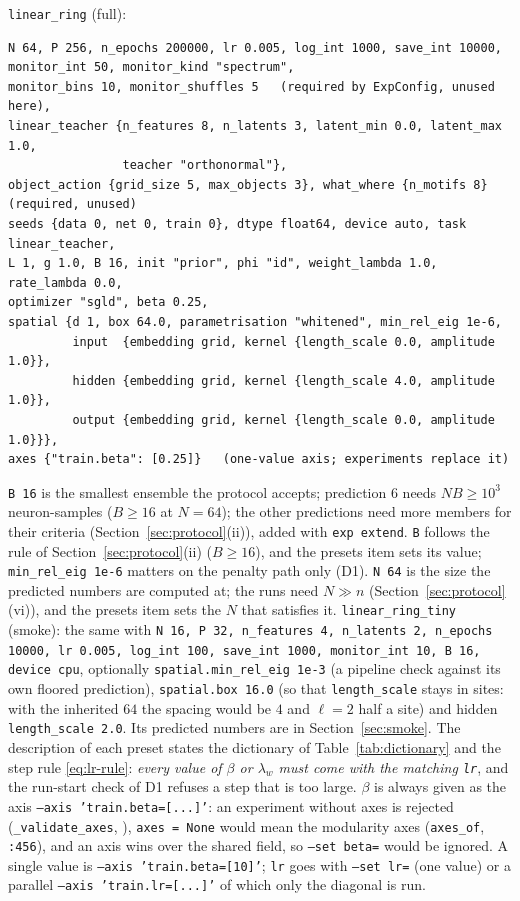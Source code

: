 \documentclass[11pt,a4paper]{article}
\newcommand{\code}[1]{\texttt{#1}}
\begin{document}
\code{linear\_ring} (full):
\begin{verbatim}
N 64, P 256, n_epochs 200000, lr 0.005, log_int 1000, save_int 10000,
monitor_int 50, monitor_kind "spectrum",
monitor_bins 10, monitor_shuffles 5   (required by ExpConfig, unused here),
linear_teacher {n_features 8, n_latents 3, latent_min 0.0, latent_max 1.0,
                teacher "orthonormal"},
object_action {grid_size 5, max_objects 3}, what_where {n_motifs 8}   (required, unused)
seeds {data 0, net 0, train 0}, dtype float64, device auto, task linear_teacher,
L 1, g 1.0, B 16, init "prior", phi "id", weight_lambda 1.0, rate_lambda 0.0,
optimizer "sgld", beta 0.25,
spatial {d 1, box 64.0, parametrisation "whitened", min_rel_eig 1e-6,
         input  {embedding grid, kernel {length_scale 0.0, amplitude 1.0}},
         hidden {embedding grid, kernel {length_scale 4.0, amplitude 1.0}},
         output {embedding grid, kernel {length_scale 0.0, amplitude 1.0}}},
axes {"train.beta": [0.25]}   (one-value axis; experiments replace it)
\end{verbatim}
\code{B 16} is the smallest ensemble the protocol accepts; prediction 6 needs $NB\ge10^3$ neuron-samples ($B\ge16$ at $N = 64$); the other predictions need more members for their criteria (Section~\ref{sec:protocol}(ii)), added with \code{exp extend}. \code{B} follows the rule of Section~\ref{sec:protocol}(ii) ($B\ge16$), and the presets item sets its value; \code{min\_rel\_eig 1e-6} matters on the penalty path only (D1). \code{N 64} is the size the predicted numbers are computed at; the runs need $N\gg n$ (Section~\ref{sec:protocol}(vi)), and the presets item sets the $N$ that satisfies it. \code{linear\_ring\_tiny} (smoke): the same with \code{N 16, P 32, n\_features 4, n\_latents 2, n\_epochs 10000, lr 0.005, log\_int 100, save\_int 1000, monitor\_int 10, B 16, device cpu}, optionally \code{spatial.min\_rel\_eig 1e-3} (a pipeline check against its own floored prediction), \code{spatial.box 16.0} (so that \code{length\_scale} stays in sites: with the inherited $64$ the spacing would be $4$ and $\ell = 2$ half a site) and hidden \code{length\_scale 2.0}. Its predicted numbers are in Section~\ref{sec:smoke}. The description of each preset states the dictionary of Table~\ref{tab:dictionary} and the step rule \eqref{eq:lr-rule}: \emph{every value of $\beta$ or $\lambda_w$ must come with the matching \code{lr}}, and the run-start check of D1 refuses a step that is too large. $\beta$ is always given as the axis \code{--axis 'train.beta=[...]'}: an experiment without axes is rejected (\code{\_validate\_axes}, ), \code{axes = None} would mean the modularity axes (\code{axes\_of}, \code{:456}), and an axis wins over the shared field, so \code{--set beta=} would be ignored. A single value is \code{--axis 'train.beta=[10]'}; \code{lr} goes with \code{--set lr=} (one value) or a parallel \code{--axis 'train.lr=[...]'} of which only the diagonal is run.
\end{document}
